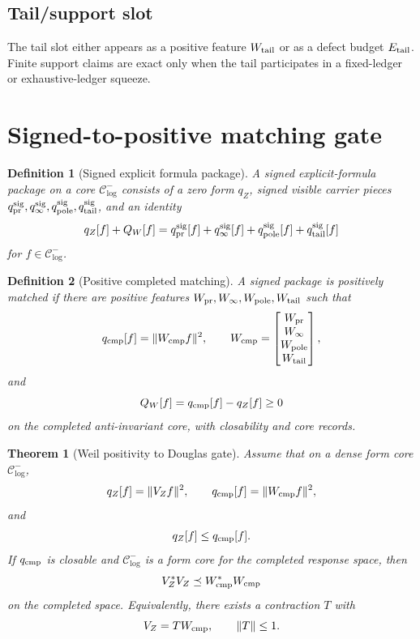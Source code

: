 \documentclass[11pt]{article}
\newtheorem{theorem}{Theorem}
\newtheorem{definition}{Definition}
\begin{document}
\subsection{Tail/support slot}
The tail slot either appears as a positive feature $W_{\rm tail}$ or as a defect budget $E_{\rm tail}$. Finite support claims are exact only when the tail participates in a fixed-ledger or exhaustive-ledger squeeze.

\section{Signed-to-positive matching gate}
\begin{definition}[Signed explicit formula package]
A signed explicit-formula package on a core $\mathcal C^-_{\log}$ consists of a zero form $q_Z$, signed visible carrier pieces $q_{\rm pr}^{\rm sig},q_\infty^{\rm sig},q_{\rm pole}^{\rm sig},q_{\rm tail}^{\rm sig}$, and an identity
\[
q_Z[f]+Q_W[f]=q_{\rm pr}^{\rm sig}[f]+q_\infty^{\rm sig}[f]+q_{\rm pole}^{\rm sig}[f]+q_{\rm tail}^{\rm sig}[f]
\]
for $f\in\mathcal C^-_{\log}$.
\end{definition}

\begin{definition}[Positive completed matching]
A signed package is positively matched if there are positive features $W_{\rm pr},W_\infty,W_{\rm pole},W_{\rm tail}$ such that
\[
q_{\rm cmp}[f]=\|W_{\rm cmp}f\|^2,\qquad W_{\rm cmp}=\begin{bmatrix}W_{\rm pr}\\W_\infty\\W_{\rm pole}\\W_{\rm tail}\end{bmatrix},
\]
and
\[
Q_W[f]=q_{\rm cmp}[f]-q_Z[f]\ge0
\]
on the completed anti-invariant core, with closability and core records.
\end{definition}

\begin{theorem}[Weil positivity to Douglas gate]
Assume that on a dense form core $\mathcal C^-_{\log}$,
\[
q_Z[f]=\|V_Zf\|^2,\qquad q_{\rm cmp}[f]=\|W_{\rm cmp}f\|^2,
\]
and
\[
q_Z[f]\le q_{\rm cmp}[f].
\]
If $q_{\rm cmp}$ is closable and $\mathcal C^-_{\log}$ is a form core for the completed response space, then
\[
V_Z^*V_Z\preceq W_{\rm cmp}^*W_{\rm cmp}
\]
on the completed space. Equivalently, there exists a contraction $T$ with
\[
V_Z=T W_{\rm cmp},\qquad \|T\|\le1.
\]
\end{theorem}
\end{document}
